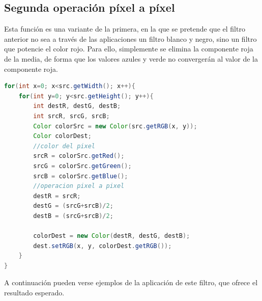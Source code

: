\subsection{Segunda operación píxel a píxel}
Esta función es una variante de la primera, en la que se pretende que el filtro anterior no sea a través de las aplicaciones un filtro blanco y negro, sino un filtro que potencie el color rojo. Para ello, simplemente se elimina la componente roja de la media, de forma que los valores azules y verde no convergerán al valor de la componente roja.
\vskip0.3cm
\begin{lstlisting}[language=Java, caption=Operación pixel a pixel, label=lst:graddesc]
for(int x=0; x<src.getWidth(); x++){
    for(int y=0; y<src.getHeight(); y++){
        int destR, destG, destB;
        int srcR, srcG, srcB;
        Color colorSrc = new Color(src.getRGB(x, y));
        Color colorDest;
        //color del pixel
        srcR = colorSrc.getRed();
        srcG = colorSrc.getGreen();
        srcB = colorSrc.getBlue();
        //operacion pixel a pixel
        destR = srcR;
        destG = (srcG+srcB)/2;
        destB = (srcG+srcB)/2;
                
        colorDest = new Color(destR, destG, destB);
        dest.setRGB(x, y, colorDest.getRGB());
    }
}
\end{lstlisting}
A continuación pueden verse ejemplos de la aplicación de este filtro, que ofrece el resultado esperado.
\vskip0.3cm
